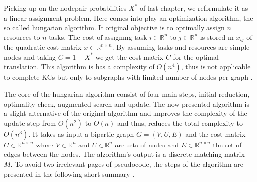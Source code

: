 Picking up on the nodepair probabilities $X^*$ of last chapter, we reformulate it as a linear assignment problem. Here comes into play an optimization algorithm, the so called hungarian algorithm. It original objective is to optimally assign $n$ resources to $n$ tasks. The cost of assigning task $i \in \mathbb{R}^n$ to $j \in \mathbb{R}^n$ is stored in $x_{ij}$ of the quadratic cost matrix $x \in \mathbb{R}^{n \times n}$. By assuming tasks and resources are simple nodes and taking $C=1-X^*$ we get the cost matrix $C$ for the optimal translation. This algorithm is has a complexity of $O\left(n^{4}\right)$, thus is not applicable to complete KGs but only to subgraphs with limited number of nodes per graph \cite{date_gpu-accelerated_2016}.

The core of the hungarian algorithm consist of four main steps, initial reduction, optimality check, augmented search and update. The now presented algorithm is a slight alternative of the original algorithm and improves the complexity of the update step from $O\left(n^{2}\right)$ to $O\left(n\right)$ and thus, reduces the total complexity to $O\left(n^{3}\right)$. It takes as input a bipartie graph $G=(V, U, E)$ and the cost matrix $C \in \mathbb{R}^{n \times n}$ where $V \in \mathbb{R}^n$ and $U \in \mathbb{R}^n$ are sets of nodes and $E \in \mathbb{R}^{n \times n}$ the set of edges between the nodes. The algorithm's output is a discrete matching matrix $M$. To avoid two irrelevant pages of pseudocode, the steps of the algorithm are presented in the following short summary \cite{mills2007dynamic}.

